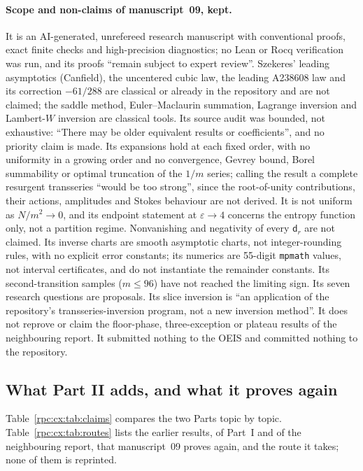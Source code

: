 \documentclass[11pt]{article}
\theoremstyle{definition}
\theoremstyle{remark}
\numberwithin{equation}{section}
\begin{document}
\paragraph{Scope and non-claims of manuscript~09, kept.}
It is an AI-generated, unrefereed research manuscript with conventional
proofs, exact finite checks and high-precision diagnostics; no Lean or Rocq
verification was run, and its proofs ``remain subject to expert review''.
Szekeres' leading asymptotics (Canfield), the uncentered cubic law, the
leading A238608 law and its correction $-61/288$ are classical or already
in the repository and are not claimed; the saddle method,
Euler--Maclaurin summation, Lagrange inversion and Lambert-$W$ inversion
are classical tools. Its source audit was bounded, not exhaustive: ``There
may be older equivalent results or coefficients'', and no priority claim is
made. Its expansions hold at each fixed order, with no uniformity in a
growing order and no convergence, Gevrey bound, Borel summability or optimal
truncation of the $1/m$ series; calling the result a complete resurgent
transseries ``would be too strong'', since the root-of-unity contributions,
their actions, amplitudes and Stokes behaviour are not derived. It is not
uniform as $N/m^2\to0$, and its endpoint statement at $\varepsilon\to4$
concerns the entropy function only, not a partition regime. Nonvanishing
and negativity of every $\mathsf d_r$ are not claimed. Its inverse charts are
smooth asymptotic charts, not integer-rounding rules, with no explicit error
constants; its numerics are 55-digit \texttt{mpmath} values, not interval
certificates, and do not instantiate the remainder constants. Its
second-transition samples ($m\le96$) have not reached the limiting sign. Its
seven research questions are proposals. Its slice inversion is ``an
application of the repository's transseries-inversion program, not a new
inversion method''. It does not reprove or claim the floor-phase,
three-exception or plateau results of the neighbouring report. It submitted
nothing to the OEIS and committed nothing to the repository.

\subsection{What Part II adds, and what it proves again}
\label{rpc:cx:sec:claims}

Table~\ref{rpc:cx:tab:claims} compares the two Parts topic by topic.
Table~\ref{rpc:cx:tab:routes} lists the earlier results, of Part~I and of
the neighbouring report, that manuscript~09 proves again, and the route it
takes; none of them is reprinted.
\end{document}
